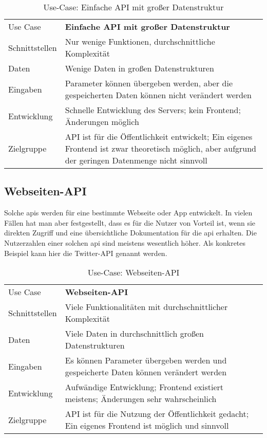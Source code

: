 \begin{table}[H]
\begin{tabular}{p{3cm} p{11cm}}
Use Case & \textbf{Einfache API mit großer Datenstruktur} \\
Schnittstellen & Nur wenige Funktionen, durchschnittliche Komplexität \\
Daten & Wenige Daten in großen Datenstrukturen \\
Eingaben & Parameter können übergeben werden, aber die gespeicherten Daten können nicht verändert werden \\
Entwicklung & Schnelle Entwicklung des Servers; kein Frontend; Änderungen möglich \\
Zielgruppe & API ist für die Öffentlichkeit entwickelt; Ein eigenes Frontend ist zwar theoretisch möglich, aber aufgrund der geringen Datenmenge nicht sinnvoll
\end{tabular}
\caption{Use-Case: Einfache API mit großer Datenstruktur}
\end{table}

\subsection{Webseiten-API}

Solche \ac{api}s werden für eine bestimmte Webseite oder App entwickelt. In vielen Fällen hat man aber festgestellt, dass es für die Nutzer von Vorteil ist, wenn sie direkten Zugriff und eine übersichtliche Dokumentation für die \ac{api} erhalten. Die Nutzerzahlen einer solchen \ac{api} sind meistens wesentlich höher. Als konkretes Beispiel kann hier die Twitter-API genannt werden.

\begin{table}[H]
\begin{tabular}{p{3cm} p{11cm}}
Use Case & \textbf{Webseiten-API} \\
Schnittstellen & Viele Funktionalitäten mit durchschnittlicher Komplexität \\
Daten & Viele Daten in durchschnittlich großen Datenstrukturen \\
Eingaben & Es können Parameter übergeben werden und gespeicherte Daten können verändert werden \\
Entwicklung & Aufwändige Entwicklung; Frontend existiert meistens; Änderungen sehr wahrscheinlich \\
Zielgruppe & API ist für die Nutzung der Öffentlichkeit gedacht; Ein eigenes Frontend ist möglich und sinnvoll
\end{tabular}
\caption{Use-Case: Webseiten-API}
\end{table}

